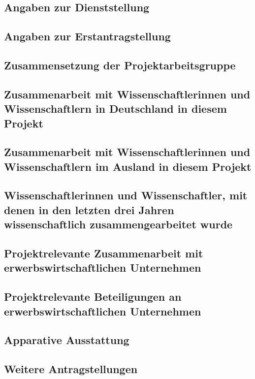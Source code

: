 \documentclass{scrartcl}
\begin{document}
\subsection{Angaben zur Dienststellung}

\subsection{Angaben zur Erstantragstellung}

\subsection{Zusammensetzung der Projektarbeitsgruppe}

\subsection{Zusammenarbeit mit Wissenschaftlerinnen und Wissenschaftlern in Deutschland in diesem Projekt}

\subsection{Zusammenarbeit mit Wissenschaftlerinnen und Wissenschaftlern im Ausland in diesem Projekt}

\subsection{Wissenschaftlerinnen und Wissenschaftler, mit denen in den letzten drei Jahren wissenschaftlich zusammengearbeitet wurde}

\subsection{Projektrelevante Zusammenarbeit mit erwerbswirtschaftlichen Unternehmen}

\subsection{Projektrelevante Beteiligungen an erwerbswirtschaftlichen Unternehmen}

\subsection{Apparative Ausstattung}

\subsection{Weitere Antragstellungen}
\end{document}
